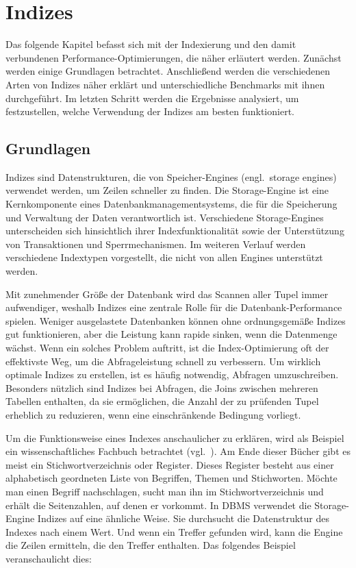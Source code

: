 
\chapter{Indizes}\label{ch:indexes}

Das folgende Kapitel befasst sich mit der Indexierung und den damit verbundenen Performance-Optimierungen, die näher erläutert werden.
Zunächst werden einige Grundlagen betrachtet.
Anschließend werden die verschiedenen Arten von Indizes näher erklärt und unterschiedliche Benchmarks mit ihnen durchgeführt.
Im letzten Schritt werden die Ergebnisse analysiert, um festzustellen, welche Verwendung der Indizes am besten funktioniert.

\section{Grundlagen}\label{sec:indexing-grundlagen}

Indizes sind Datenstrukturen, die von Speicher-Engines (engl.\ storage engines) verwendet werden, um Zeilen schneller zu finden.
Die Storage-Engine ist eine Kernkomponente eines Datenbankmanagementsystems, die für die Speicherung und Verwaltung der Daten verantwortlich ist.
Verschiedene Storage-Engines unterscheiden sich hinsichtlich ihrer Indexfunktionalität sowie der Unterstützung von Transaktionen und Sperrmechanismen.
Im weiteren Verlauf werden verschiedene Indextypen vorgestellt, die nicht von allen Engines unterstützt werden.

Mit zunehmender Größe der Datenbank wird das Scannen aller Tupel immer aufwendiger, weshalb Indizes eine zentrale Rolle für die Datenbank-Performance spielen.
Weniger ausgelastete Datenbanken können ohne ordnungsgemäße Indizes gut funktionieren, aber die Leistung kann rapide sinken, wenn die Datenmenge wächst.
Wenn ein solches Problem auftritt, ist die Index-Optimierung oft der effektivste Weg, um die Abfrageleistung schnell zu verbessern.
Um wirklich optimale Indizes zu erstellen, ist es häufig notwendig, Abfragen umzuschreiben.
Besonders nützlich sind Indizes bei Abfragen, die Joins zwischen mehreren Tabellen enthalten, da sie ermöglichen, die Anzahl der zu prüfenden Tupel erheblich zu reduzieren, wenn eine einschränkende Bedingung vorliegt.

Um die Funktionsweise eines Indexes anschaulicher zu erklären, wird als Beispiel ein wissenschaftliches Fachbuch betrachtet (vgl.\ \cite[S. 147]{schwartz2012high}).
Am Ende dieser Bücher gibt es meist ein Stichwortverzeichnis oder Register.
Dieses Register besteht aus einer alphabetisch geordneten Liste von Begriffen, Themen und Stichworten.
Möchte man einen Begriff nachschlagen, sucht man ihn im Stichwortverzeichnis und erhält die Seitenzahlen, auf denen er vorkommt.
In DBMS verwendet die Storage-Engine Indizes auf eine ähnliche Weise.
Sie durchsucht die Datenstruktur des Indexes nach einem Wert.
Und wenn ein Treffer gefunden wird, kann die Engine die Zeilen ermitteln, die den Treffer enthalten.
Das folgendes Beispiel veranschaulicht dies:

